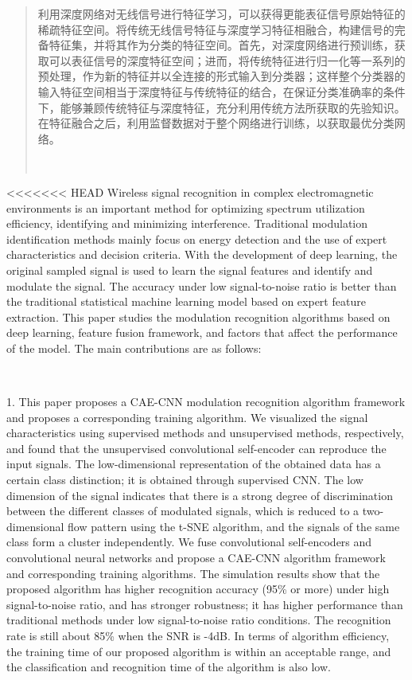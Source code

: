 \begin{abstract}
利用深度网络对无线信号进行特征学习，可以获得更能表征信号原始特征的稀疏特征空间。将传统无线信号特征与深度学习特征相融合，构建信号的完备特征集，并将其作为分类的特征空间。首先，对深度网络进行预训练，获取可以表征信号的深度特征空间；进而，将传统特征进行归一化等一系列的预处理，作为新的特征并以全连接的形式输入到分类器；这样整个分类器的输入特征空间相当于深度特征与传统特征的结合，在保证分类准确率的条件下，能够兼顾传统特征与深度特征，充分利用传统方法所获取的先验知识。在特征融合之后，利用监督数据对于整个网络进行训练，以获取最优分类网络。\par

 \\
\end{abstract}

\begin{englishabstract}
<<<<<<< HEAD
Wireless signal recognition in complex electromagnetic environments is an important method for optimizing spectrum utilization efficiency, identifying and minimizing interference. Traditional modulation identification methods mainly focus on energy detection and the use of expert characteristics and decision criteria. With the development of deep learning, the original sampled signal is used to learn the signal features and identify and modulate the signal. The accuracy under low signal-to-noise ratio is better than the traditional statistical machine learning model based on expert feature extraction. This paper studies the modulation recognition algorithms based on deep learning, feature fusion framework, and factors that affect the performance of the model. The main contributions are as follows:
\par~\par
1. This paper proposes a CAE-CNN modulation recognition algorithm framework and proposes a corresponding training algorithm. We visualized the signal characteristics using supervised methods and unsupervised methods, respectively, and found that the unsupervised convolutional self-encoder can reproduce the input signals. The low-dimensional representation of the obtained data has a certain class distinction; it is obtained through supervised CNN. The low dimension of the signal indicates that there is a strong degree of discrimination between the different classes of modulated signals, which is reduced to a two-dimensional flow pattern using the t-SNE algorithm, and the signals of the same class form a cluster independently. We fuse convolutional self-encoders and convolutional neural networks and propose a CAE-CNN algorithm framework and corresponding training algorithms. The simulation results show that the proposed algorithm has higher recognition accuracy (95\% or more) under high signal-to-noise ratio, and has stronger robustness; it has higher performance than traditional methods under low signal-to-noise ratio conditions. The recognition rate is still about 85\% when the SNR is -4dB. In terms of algorithm efficiency, the training time of our proposed algorithm is within an acceptable range, and the classification and recognition time of the algorithm is also low.

\end{englishabstract}
